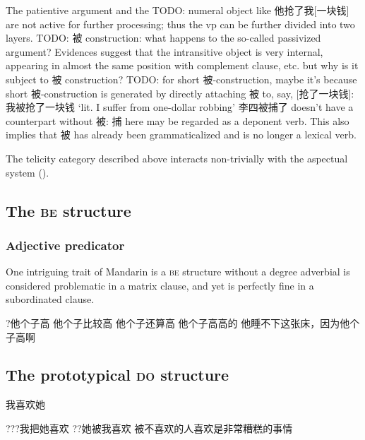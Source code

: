 \documentclass[UTF8, a4paper, oneside, scheme=plain, 12pt]{ctexrep}
\newcommand{\translate}[1]{`#1'}
\newcommand*{\category}[1]{\textsc{#1}}
\begin{document}
The patientive argument and the TODO: numeral object like 他抢了我[一块钱] 
are not active for further processing; 
thus the \acs{vp} can be further divided into two layers.
TODO: 被 construction: what happens to the so-called passivized argument?
Evidences suggest that the intransitive object is very internal, 
appearing in almost the same position with complement clause, etc.
but why is it subject to 被 construction? 
TODO: for short 被-construction, 
maybe it's because short 被-construction is generated by directly attaching 被 to, say, [抢了一块钱]: 
我被抢了一块钱 \translate{lit. I suffer from one-dollar robbing}
李四被捕了 doesn't have a counterpart without 被: 
捕 here may be regarded as a deponent verb. 
This also implies that 被 has already been grammaticalized 
and is no longer a lexical verb.


The telicity category described above interacts non-trivially with 
the aspectual system ().

\subsection{The \category{be} structure}\label{sec:verb-phrase.be}

\subsubsection{Adjective predicator}

One intriguing trait of Mandarin is a \category{be} structure 
without a degree adverbial is considered problematic
in a matrix clause,
and yet is perfectly fine in a subordinated clause.

\begin{exe}
    \ex ?他个子高
    \ex 他个子比较高
    \ex 他个子还算高
    \ex 他个子高高的
    \ex 他睡不下这张床，因为他个子高啊
\end{exe}

\subsection{The prototypical \category{do} structure}\label{sec:verb-phrase.do.standard}

\begin{exe}
    \ex 我喜欢她
    \ex 
    \begin{xlist}
        \ex\label{ex:vp.do.standard.ba-1} ???我把她喜欢
        \ex ??她被我喜欢
        \ex 被不喜欢的人喜欢是非常糟糕的事情
    \end{xlist}
\end{exe}
\end{document}
